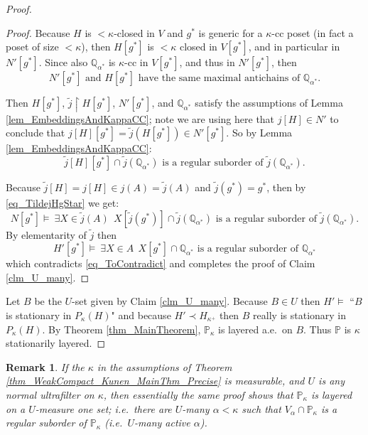 \documentclass{amsart}
\newtheorem{remark}[theorem]{Remark}
\begin{document}
\begin{proof}
\begin{proof}
Because $H$ is $<\kappa$-closed in $V$ and $g^*$ is generic for a $\kappa$-cc poset (in fact a poset of size $<\kappa$), then $H[g^*]$ is $<\kappa$ closed in $V[g^*]$, and in particular in $N'[g^*]$.  Since also $\mathbb{Q}_{\alpha^*}$ is $\kappa$-cc in $V[g^*]$, and thus in $N'[g^*]$, then
\begin{equation}
N'[g^*] \text{ and }  H[g^*] \text{ have the same maximal antichains of } \mathbb{Q}_{\alpha^*}. 
\end{equation}

Then $H[g^*]$, $\tilde{j} \restriction H[g^*]$, $N'[g^*]$, and $\mathbb{Q}_{\alpha^*}$ satisfy the assumptions of Lemma \ref{lem_EmbeddingsAndKappaCC}; note we are using here that $j[H] \in N'$ to conclude that $j[H][g^*] = \tilde{j}(H[g^*]) \in N'[g^*]$.  So by Lemma \ref{lem_EmbeddingsAndKappaCC}:
\begin{equation}\label{eq_TildejHgStar}
\tilde{j}[H][g^*] \cap \tilde{j}(\mathbb{Q}_{\alpha^*}) \text{ is a regular suborder of } \tilde{j}(\mathbb{Q}_{\alpha^*}).
\end{equation}

Because $\tilde{j}[H] = j[H] \in j(A) =  \tilde{j}(A)$ and $\tilde{j}(g^*)=g^*$, then by \eqref{eq_TildejHgStar} we get:
\begin{equation*}
N[g^*] \models  \ \exists X \in \tilde{j}(A) \ \ X[\tilde{j}(g^*)] \cap \tilde{j}(\mathbb{Q}_{\alpha^*}) \text{ is a regular suborder of } \tilde{j}(\mathbb{Q}_{\alpha^*}).
\end{equation*}
By elementarity of $\tilde{j}$ then
\begin{equation*}
H'[g^*] \models \ \exists X \in A \ \ X[g^*] \cap \mathbb{Q}_{\alpha^*} \text{ is a regular suborder of } \mathbb{Q}_{\alpha^*}
\end{equation*}
which contradicts \eqref{eq_ToContradict} and completes the proof of Claim \ref{clm_U_many}.
\end{proof}

Let $B$ be the $U$-set given by Claim \ref{clm_U_many}.  Because $B \in U$ then $H' \models$ ``$B$ is stationary in $P_\kappa(H)$" and because $H' \prec H_{\kappa^+}$ then $B$ really is stationary in $P_\kappa(H)$.  By Theorem \ref{thm_MainTheorem}, $\mathbb{P}_\kappa$ is layered a.e.\ on $B$.  Thus $\mathbb{P}$ is $\kappa$ stationarily layered.   
\end{proof}

\begin{remark}
If the $\kappa$ in the assumptions of Theorem \ref{thm_WeakCompact_Kunen_MainThm_Precise} is measurable, and $U$ is any normal ultrafilter on $\kappa$, then essentially the same proof shows that $\mathbb{P}_\kappa$ is layered on a $U$-measure one set; i.e.\ there are $U$-many $\alpha < \kappa$ such that $V_\alpha \cap \mathbb{P}_\kappa$ is a regular suborder of $\mathbb{P}_\kappa$ (i.e.\ $U$-many active $\alpha$).  
\end{remark}
\end{document}
